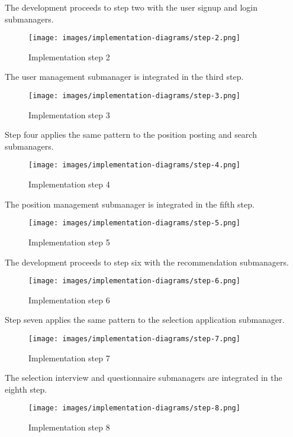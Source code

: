 The development proceeds to step two with the user signup and login submanagers.

\begin{figure}[h]
    \centering
    \texttt{[image: images/implementation-diagrams/step-2.png]}
    \caption{Implementation step 2}
\end{figure}

\newpage
The user management submanager is integrated in the third step.

\begin{figure}[h]
    \centering
    \texttt{[image: images/implementation-diagrams/step-3.png]}
    \caption{Implementation step 3}
\end{figure}

\newpage
Step four applies the same pattern to the position posting and search submanagers.

\begin{figure}[h]
    \centering
    \texttt{[image: images/implementation-diagrams/step-4.png]}
    \caption{Implementation step 4}
\end{figure}

\newpage
The position management submanager is integrated in the fifth step.

\begin{figure}[h]
    \centering
    \texttt{[image: images/implementation-diagrams/step-5.png]}
    \caption{Implementation step 5}
\end{figure}

\newpage
The development proceeds to step six with the recommendation submanagers.

\begin{figure}[h]
    \centering
    \texttt{[image: images/implementation-diagrams/step-6.png]}
    \caption{Implementation step 6}
\end{figure}

\newpage
Step seven applies the same pattern to the selection application submanager.

\begin{figure}[h]
    \centering
    \texttt{[image: images/implementation-diagrams/step-7.png]}
    \caption{Implementation step 7}
\end{figure}

\newpage
The selection interview and questionnaire submanagers are integrated in the eighth step.

\begin{figure}[h]
    \centering
    \texttt{[image: images/implementation-diagrams/step-8.png]}
    \caption{Implementation step 8}
\end{figure}

